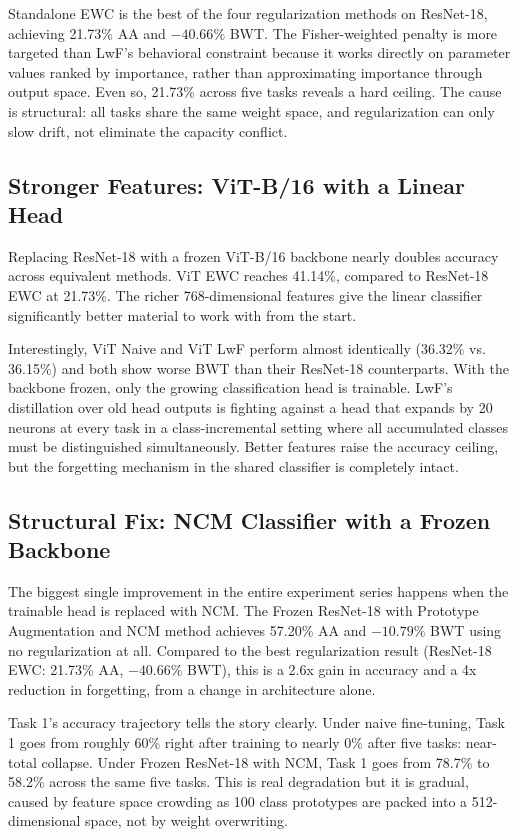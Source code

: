 \documentclass{article}
\begin{document}
Standalone EWC is the best of the four regularization methods on ResNet-18,
achieving 21.73\% AA and $-40.66\%$ BWT. The Fisher-weighted penalty is more
targeted than LwF's behavioral constraint because it works directly on parameter
values ranked by importance, rather than approximating importance through output
space. Even so, 21.73\% across five tasks reveals a hard ceiling. The cause is
structural: all tasks share the same weight space, and regularization can only
slow drift, not eliminate the capacity conflict.

\subsection{Stronger Features: ViT-B/16 with a Linear Head}

Replacing ResNet-18 with a frozen ViT-B/16 backbone nearly doubles accuracy
across equivalent methods. ViT EWC reaches 41.14\%, compared to ResNet-18 EWC
at 21.73\%. The richer 768-dimensional features give the linear classifier
significantly better material to work with from the start.

Interestingly, ViT Naive and ViT LwF perform almost identically (36.32\% vs.
36.15\%) and both show worse BWT than their ResNet-18 counterparts. With the
backbone frozen, only the growing classification head is trainable. LwF's
distillation over old head outputs is fighting against a head that expands by 20
neurons at every task in a class-incremental setting where all accumulated
classes must be distinguished simultaneously. Better features raise the accuracy
ceiling, but the forgetting mechanism in the shared classifier is completely
intact.

\subsection{Structural Fix: NCM Classifier with a Frozen Backbone}

The biggest single improvement in the entire experiment series happens when the
trainable head is replaced with NCM. The Frozen ResNet-18 with Prototype
Augmentation and NCM method achieves 57.20\% AA and $-10.79\%$ BWT using no
regularization at all. Compared to the best regularization result (ResNet-18
EWC: 21.73\% AA, $-40.66\%$ BWT), this is a 2.6x gain in accuracy and a 4x
reduction in forgetting, from a change in architecture alone.

Task 1's accuracy trajectory tells the story clearly. Under naive fine-tuning,
Task 1 goes from roughly 60\% right after training to nearly 0\% after five
tasks: near-total collapse. Under Frozen ResNet-18 with NCM, Task 1 goes from
78.7\% to 58.2\% across the same five tasks. This is real degradation but it is
gradual, caused by feature space crowding as 100 class prototypes are packed
into a 512-dimensional space, not by weight overwriting.
\end{document}
